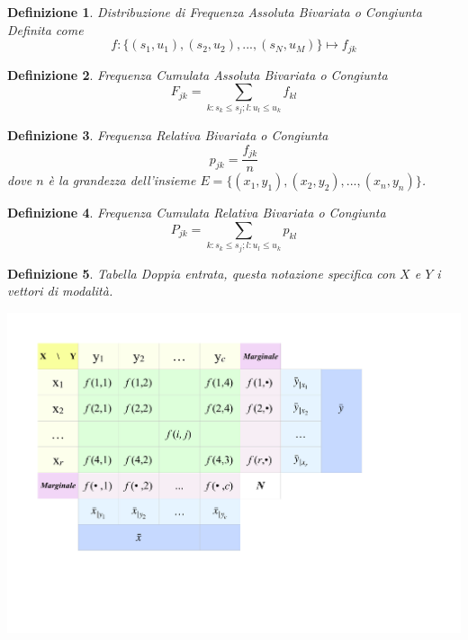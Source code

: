 \documentclass{article}
\newtheorem{definition}{Definizione}[section]
\begin{document}
       \begin{definition}{Distribuzione di Frequenza Assoluta Bivariata o Congiunta} 
            Definita come $$f\colon \{(s_1,u_1),(s_2,u_2),...,(s_N,u_M)\}\mapsto f_{jk}$$
      \end{definition}
    
         \begin{definition}{Frequenza Cumulata Assoluta Bivariata o Congiunta}
    $$ F_{jk}= \sum_{k:s_k \leq s_j; l:u_l \leq u_k} f_{kl}$$
    \end{definition}
    
    
     \begin{definition}{Frequenza Relativa Bivariata o Congiunta}
        $$p_{jk}=\frac{f_{jk}}{n}$$ dove $n$ è la grandezza dell'insieme $E=\{(x_1,y_1),(x_2,y_2),...,(x_n,y_n)\}$.
    \end{definition}
    
      \begin{definition}{Frequenza Cumulata Relativa Bivariata o Congiunta}
        $$ P_{jk}=\sum_{k:s_k \leq s_j; l:u_l \leq u_k} p_{kl}$$
    \end{definition}
    \newpage
       \begin{definition}{Tabella Doppia entrata}, questa notazione specifica con $X$ e  $Y$ i vettori di modalità. 
            \begin{center}
                        \includegraphics[scale=0.35]{image/tabella.pdf}
                      \end{center}
     \end{definition}
     
\end{document}
